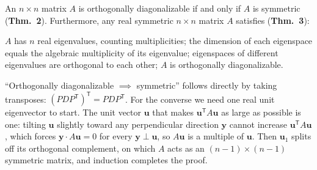 \documentclass[10pt]{scrartcl}
\newcommand{\vv}[1]{\mathbf{#1}}
\begin{document}
\begin{theorem*}
  An $n\times n$ matrix $A$ is orthogonally diagonalizable if and only if $A$ is symmetric (\textbf{Thm.~2}). Furthermore, any real symmetric $n\times n$ matrix $A$ satisfies (\textbf{Thm.~3}):
  \begin{enumerate}
    \ii[(a)] $A$ has $n$ real eigenvalues, counting multiplicities;
    \ii[(b)] the dimension of each eigenspace equals the algebraic multiplicity of its eigenvalue;
    \ii[(c)] eigenspaces of different eigenvalues are orthogonal to each other;
    \ii[(d)] $A$ is orthogonally diagonalizable.
  \end{enumerate}
\end{theorem*}
\begin{ideabox}
  ``Orthogonally diagonalizable $\implies$ symmetric'' follows directly by taking transposes: $(PDP^{\mathsf T})^{\mathsf T}=PDP^{\mathsf T}$. For the converse we need one real unit eigenvector to start. The unit vector $\vv u$ that makes $\vv u^{\mathsf T}A\vv u$ as large as possible is one: tilting $\vv u$ slightly toward any perpendicular direction $\vv y$ cannot increase $\vv u^{\mathsf T}A\vv u$, which forces $\vv y\cdot A\vv u=0$ for every $\vv y\perp\vv u$, so $A\vv u$ is a multiple of $\vv u$. Then $\vv u_1$ splits off its orthogonal complement, on which $A$ acts as an $(n-1)\times(n-1)$ symmetric matrix, and induction completes the proof.
\end{ideabox}
\end{document}
